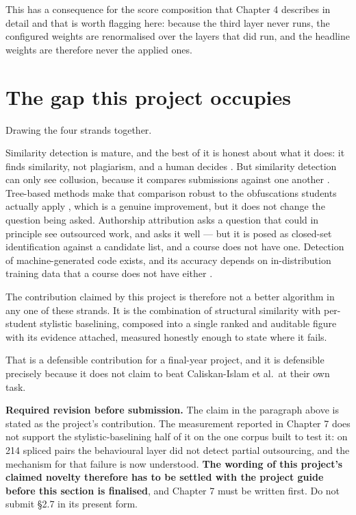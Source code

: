 This has a consequence for the score composition that Chapter 4
describes in detail and that is worth flagging here: because the third
layer never runs, the configured weights are renormalised over the
layers that did run, and the headline weights are therefore never the
applied ones.

\hypertarget{the-gap-this-project-occupies}{%
\section{The gap this project
occupies}\label{the-gap-this-project-occupies}}

Drawing the four strands together.

Similarity detection is mature, and the best of it is honest about what
it does: it finds similarity, not plagiarism, and a human decides
\cite{novak2019}. But similarity detection can only see collusion,
because it compares submissions against one another
\cite{schleimer2003, prechelt2002}. Tree-based methods make that
comparison robust to the obfuscations students actually apply
\cite{pawlik2016, jiang2007}, which is a genuine improvement, but it
does not change the question being asked. Authorship attribution asks a
question that could in principle see outsourced work, and asks it well
\cite{caliskan2015, frantzeskou2006, abuhamad2019} --- but it is posed
as closed-set identification against a candidate list, and a course does
not have one. Detection of machine-generated code exists, and its
accuracy depends on in-distribution training data that a course does not
have either \cite{gptsniffer2024}.

The contribution claimed by this project is therefore not a better
algorithm in any one of these strands. It is the combination of
structural similarity with per-student stylistic baselining, composed
into a single ranked and auditable figure with its evidence attached,
measured honestly enough to state where it fails.

That is a defensible contribution for a final-year project, and it is
defensible precisely because it does not claim to beat Caliskan-Islam et
al.~at their own task.

\begin{draftnote}

\textbf{Required revision before submission.} The claim in the paragraph
above is stated as the project's contribution. The measurement reported
in Chapter 7 does not support the stylistic-baselining half of it on the
one corpus built to test it: on 214 spliced pairs the behavioural layer
did not detect partial outsourcing, and the mechanism for that failure
is now understood. \textbf{The wording of this project's claimed novelty
therefore has to be settled with the project guide before this section
is finalised}, and Chapter 7 must be written first. Do not submit \S{}2.7
in its present form.

\end{draftnote}

